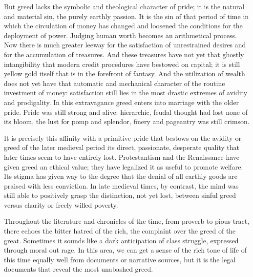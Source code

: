 But greed lacks the symbolic and theological character of pride; it is
the natural and material sin, the purely earthly passion. It is the sin
of that period of time in which the circulation of money has changed and
loosened the conditions for the deployment of power. Judging human worth
becomes an arithmetical process. Now there is much greater leeway for
the satisfaction of unrestrained desires and for the accumulation of
treasures. And these treasures have not yet that ghostly intangibility
that modern credit procedures have bestowed on capital; it is still
yellow gold itself that is in the forefront of fantasy. And the
utilization of wealth does not yet have that automatic and mechanical
character of the routine investment of money: satisfaction still lies in
the most drastic extremes of avidity and prodigality. In this
extravagance greed enters into marriage with the older pride. Pride was
still strong and alive: hierarchic, feudal thought had lost none of its
bloom, the lust for pomp and splendor, finery and pageantry was still
crimson.

It is precisely this affinity with a primitive pride that bestows on the
avidity or greed of the later medieval period its direct, passionate,
desperate quality that later times seem to have entirely lost.
Protestantism and the Renaissance have given greed an ethical value;
they have legalized it as useful to promote welfare. Its stigma has
given way to the degree that the denial of all earthly goods are praised
with less conviction. In late medieval times, by contrast, the mind was
still able to positively grasp the distinction, not yet lost, between
sinful greed versus charity or freely willed poverty.

Throughout the literature and chronicles of the time, from proverb to
pious tract, there echoes the bitter hatred of the rich, the complaint
over the greed of the great. Sometimes it sounds like a dark
anticipation of class struggle, expressed through moral out
\protect\hypertarget{08_Chapter_One__THE_PASSIONATE_INTE.xhtmlux5cux23page_27}{}{}rage.
In this area, we can get a sense of the rich tone of life of this time
equally well from documents or narrative sources, but it is the legal
documents that reveal the most unabashed greed.

